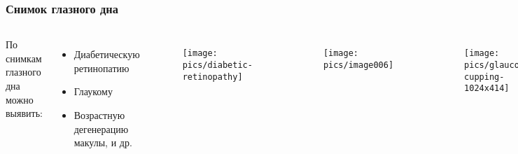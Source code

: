 \documentclass{beamer}
\begin{document}

\begin{frame}
	\frametitle{Снимок глазного дна}
	
	\begin{columns}[c] %
		
		
		По снимкам глазного дна можно выявить:
		\begin{itemize}
			\item Диабетическую ретинопатию
			\item Глаукому
			\item Возрастную дегенерацию макулы, и др.
		\end{itemize}
		
		\begin{figure}
			\centering
			\texttt{[image: pics/diabetic-retinopathy]}
			\label{fig:diabetic-retinopathy}
		\end{figure}
		
		
		\begin{figure}
			\centering
			\texttt{[image: pics/image006]}
			\label{fig:image006}
		\end{figure}
		
		\begin{figure}
		\centering
		\texttt{[image: pics/glaucoma-cupping-1024x414]}
		\label{fig:glaucoma-cupping-1024x414}
		\end{figure}
		
		
	\end{columns}
	
\end{frame}

\end{document}
